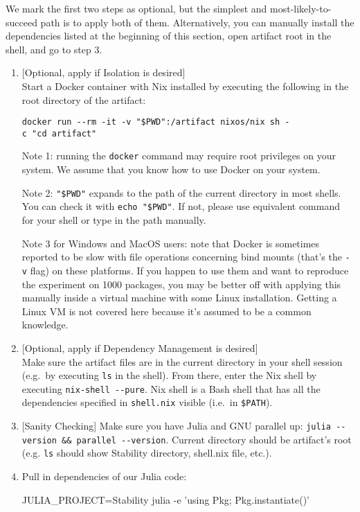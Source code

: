 \documentclass[
]{article}
\begin{document}
We mark the first two steps as optional, but the simplest and most-likely-to-succeed
path is to apply both of them.
Alternatively, you can manually install the dependencies listed at the beginning
of this section, open artifact root in the shell, and go to step 3.

\begin{enumerate}
\def\labelenumi{\arabic{enumi}.}
\item
  {[}Optional, apply if Isolation is desired{]}\\
  Start a Docker container with Nix installed by executing the following
  in the root directory of the artifact:

  \texttt{docker\ run\ -\/-rm\ -it\ -v\ "\$PWD":/artifact\ nixos/nix\ sh\ -c\ "cd\ artifact"}

  Note 1: running the \texttt{docker} command may require root
  privileges on your system. We assume that you know how to use Docker
  on your system.

  Note 2: \texttt{"\$PWD"} expands to the path of the current directory
  in most shells. You can check it with \texttt{echo\ "\$PWD"}. If not,
  please use equivalent command for your shell or type in the path
  manually.

  Note 3 for Windows and MacOS users: note that Docker is sometimes
  reported to be slow with file operations concerning bind mounts
  (that's the \texttt{-v} flag) on these platforms. If you happen to use
  them and want to reproduce the experiment on 1000 packages, you may be
  better off with applying this manually inside a virtual machine with
  some Linux installation. Getting a Linux VM is not covered here
  because it's assumed to be a common knowledge.
\item
  {[}Optional, apply if Dependency Management is desired{]}\\
  Make sure the artifact files are in the current directory in your
  shell session (e.g.~by executing \texttt{ls} in the shell). From
  there, enter the Nix shell by executing \texttt{nix-shell\ -\/-pure}.
  Nix shell is a Bash shell that has all the dependencies specified in
  \texttt{shell.nix} visible (i.e.~in \texttt{\$PATH}).
\item
  {[}Sanity Checking{]} Make sure you have Julia and GNU parallel up:
  \texttt{julia\ -\/-version\ \&\&\ parallel\ -\/-version}.
  Current directory should be artifact's root (e.g. \texttt{ls} should show
  Stability directory, shell.nix file, etc.).
\item
  Pull in dependencies of our Julia code:

\begin{verbnobox}[\small]
JULIA_PROJECT=Stability julia -e 'using Pkg; Pkg.instantiate()'
\end{verbnobox}
\end{enumerate}
\end{document}
